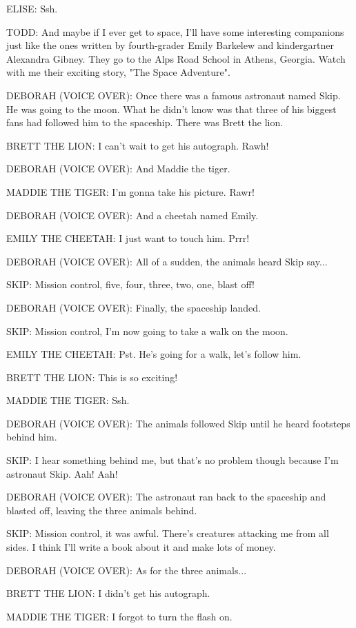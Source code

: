 ELISE:
Ssh.

TODD:
And maybe if I ever get to space, I'll have some interesting companions just like the ones written by fourth-grader Emily Barkelew and kindergartner Alexandra Gibney.
They go to the Alps Road School in Athens, Georgia.
Watch with me their exciting story, "The Space Adventure".

DEBORAH (VOICE OVER):
Once there was a famous astronaut named Skip.
He was going to the moon.
What he didn't know was that three of his biggest fans had followed him to the spaceship.
There was Brett the lion.

BRETT THE LION:
I can't wait to get his autograph.
Rawh!

DEBORAH (VOICE OVER):
And Maddie the tiger.

MADDIE THE TIGER:
I'm gonna take his picture.
Rawr!

DEBORAH (VOICE OVER):
And a cheetah named Emily.

EMILY THE CHEETAH:
I just want to touch him.
Prrr!

DEBORAH (VOICE OVER):
All of a sudden, the animals heard Skip say...

SKIP:
Mission control, five, four, three, two, one, blast off!

DEBORAH (VOICE OVER):
Finally, the spaceship landed.

SKIP:
Mission control, I'm now going to take a walk on the moon.

EMILY THE CHEETAH:
Pst.
He's going for a walk, let's follow him.

BRETT THE LION:
This is so exciting!

MADDIE THE TIGER:
Ssh.

DEBORAH (VOICE OVER):
The animals followed Skip until he heard footsteps behind him.

SKIP:
I hear something behind me, but that's no problem though because I'm astronaut Skip.
Aah! Aah!

DEBORAH (VOICE OVER):
The astronaut ran back to the spaceship and blasted off, leaving the three animals behind.

SKIP:
Mission control, it was awful.
There's creatures attacking me from all sides.
I think I'll write a book about it and make lots of money.

DEBORAH (VOICE OVER):
As for the three animals...

BRETT THE LION:
I didn't get his autograph.

MADDIE THE TIGER:
I forgot to turn the flash on.

